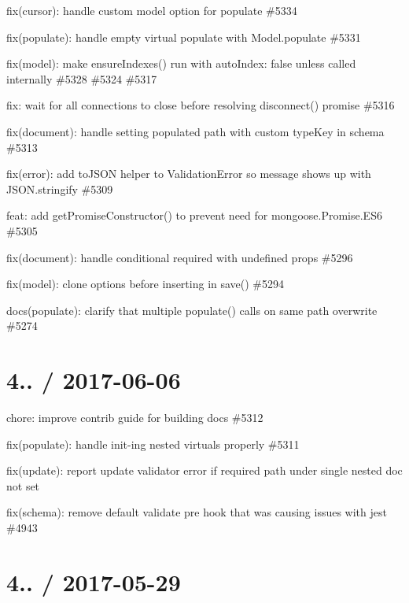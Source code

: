 \begin{DoxyItemize}
\item fix(cursor)\+: handle custom model option for populate \#5334
\item fix(populate)\+: handle empty virtual populate with Model.\+populate \#5331
\item fix(model)\+: make ensure\+Indexes() run with auto\+Index\+: false unless called internally \#5328 \#5324 \#5317
\item fix\+: wait for all connections to close before resolving disconnect() promise \#5316
\item fix(document)\+: handle setting populated path with custom type\+Key in schema \#5313
\item fix(error)\+: add to\+J\+S\+ON helper to Validation\+Error so {\ttfamily message} shows up with J\+S\+O\+N.\+stringify \#5309
\item feat\+: add {\ttfamily get\+Promise\+Constructor()} to prevent need for {\ttfamily mongoose.\+Promise.\+E\+S6} \#5305
\item fix(document)\+: handle conditional required with undefined props \#5296
\item fix(model)\+: clone options before inserting in save() \#5294
\item docs(populate)\+: clarify that multiple populate() calls on same path overwrite \#5274
\end{DoxyItemize}

\section*{4.. / 2017-\/06-\/06 }


\begin{DoxyItemize}
\item chore\+: improve contrib guide for building docs \#5312
\item fix(populate)\+: handle init-\/ing nested virtuals properly \#5311
\item fix(update)\+: report update validator error if required path under single nested doc not set
\item fix(schema)\+: remove default validate pre hook that was causing issues with jest \#4943
\end{DoxyItemize}

\section*{4.. / 2017-\/05-\/29 }


